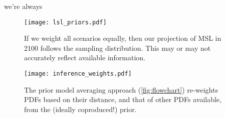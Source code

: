 \begin{block}{we're always }
    \begin{figure}
        \centering
        \texttt{[image: lsl\_priors.pdf]}
        \caption{
            If we weight all scenarios equally, then our projection of MSL in 2100 follows the sampling distribution.
            This may or may not accurately reflect available information.
        }
    \end{figure}
    \begin{figure}
        \centering
        \texttt{[image: inference\_weights.pdf]}
        \caption{
            The prior model averaging approach (\cref{fig:flowchart}) re-weights PDFs based on their distance, and that of other PDFs available, from the (ideally coproduced!) prior.
        }
    \end{figure}
\end{block}